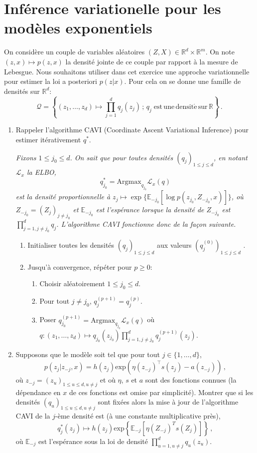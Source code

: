 \documentclass[a4paper,10pt,fleqn]{article}
\newcommand{\eqsp}{\,}
\newcommand{\1}{\ensuremath{\mathbbm{1}}}
\begin{document}
\section{Inf\'erence variationelle pour les mod\`eles exponentiels}
On consid\`ere un couple de variables al\'eatoires $(Z,X)\in\mathbb{R}^d\times \mathbb{R}^m$. On note $(z,x) \mapsto p(z,x)$ la densit\'e jointe de ce couple par rapport \`a la mesure de Lebesgue. Nous souhaitons utiliser dans cet exercice une approche variationnelle pour estimer la loi a posteriori $p(z|x)$. Pour cela on se donne une famille de densit\'es sur $\mathbb{R}^d$:
$$
\mathcal{Q} = \left\{(z_1,\ldots,z_d)\mapsto \prod_{j=1}^dq_j(z_j)\eqsp;\eqsp q_j\; \mathrm{est\,une\,densit\acute e\,sur\,\mathbb{R}}\right\}\eqsp.
$$
\begin{enumerate}
\item Rappeler l'algorithme CAVI (Coordinate Ascent Variational Inference) pour estimer it\'erativement $q^*$.

\vspace{.2cm}

{\em
Fixons $1\leq j_0 \leq d$. On sait que pour toutes densit\'es $(q_j)_{1\leq j \leq d}$, en notant $\mathcal{L}_x$ la ELBO,
$$
q_{j_0}^* = \mathrm{Argmax}_{q_{j_0}} \mathcal{L}_x(q) 
$$
est la densit\'e proportionnelle \`a $z_j \mapsto \exp\{\mathbb{E}_{-j_0}[\log p (z_{j_0},Z_{-j_0},x)]\}$, o\`u $Z_{-j_0} = (Z_j)_{j\neq j_0}$ et $\mathbb{E}_{-j_0}$ est l'esp\'erance lorsque la densit\'e de $Z_{-j_0}$ est $\prod_{j=1,j\neq j_0}^dq_j$. L'algorithme CAVI fonctionne donc de la fa\c con suivante.
\begin{enumerate}
\item Initialiser toutes les densit\'es $(q_j)_{1\leq j \leq d}$ aux valeurs $(q^{(0)}_j)_{1\leq j \leq d}$ .
\item Jusqu'\`a convergence, r\'ep\'eter pour $p\geq 0$:
\begin{enumerate}
\item Choisir al\'eatoirement $1\leq j_0 \leq d$.
\item Pour tout $j\neq j_0$, $q^{(p+1)}_j = q^{(p)}_j$.
\item Poser $q^{(p+1)}_{j_0} = \mathrm{Argmax}_{q_{j_0}} \mathcal{L}_x(q)$ o\`u $q:(z_1,\ldots,z_d)\mapsto q_{j_0}(z_{j_0})\prod_{j=1,j\neq j_0}^{d}q^{(p+1)}_j(z_j)$. 
\end{enumerate}
\end{enumerate}
}
\item Supposons que le mod\`ele soit tel que pour tout $j\in\{1,\ldots,d\}$, 
$$
p(z_j|z_{-j},x) = h(z_j)\mathrm{exp}(\eta(z_{-j})^\top s(z_j) - a(z_{-j}))\eqsp,
$$ 
o\`u $z_{-j} = (z_u)_{1\leqslant u\leqslant d, u \neq j}$ et o\`u $\eta$, $s$ et $a$ sont des fonctions connues (la d\'ependance en $x$ de ces fonctions est omise par simplicit\'e). Montrer que si les densit\'es $(q_u)_{1\leqslant u\leqslant d, u \neq j}$ sont fix\'ees alors la mise \`a jour de l'algorithme CAVI de la $j$-\`eme densit\'e est  (\`a une constante multiplicative pr\`es),
$$
q^*_j(z_j) \mapsto h(z_j) \mathrm{exp}\left\{\mathbb{E}_{-j}[\eta(Z_{-j})^Ts(Z_j)]\right\}\eqsp,
$$
o\`u $\mathbb{E}_{-j}$ est l'esp\'erance sous la loi de densit\'e $\prod_{u=1, u\neq j}^d q_u(z_u)$.


\end{enumerate}
\end{document}
